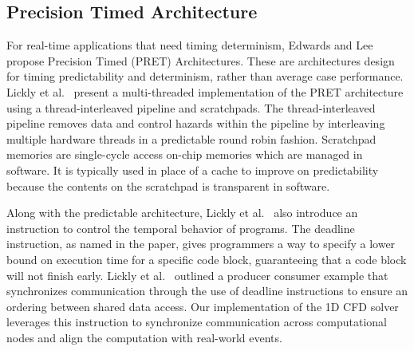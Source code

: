 \subsection{Precision Timed Architecture}
\label{sec:PRET}
For real-time applications that need timing determinism, Edwards and Lee~\cite{Edwards:2007} propose Precision Timed (PRET) Architectures. 
These are architectures design for timing predictability and determinism, rather than average case performance. 
Lickly et al.~\cite{pret_cases08} present a multi-threaded implementation of the PRET architecture using a thread-interleaved pipeline and scratchpads.  
The thread-interleaved pipeline removes data and control hazards within the pipeline by interleaving multiple hardware threads in a predictable round robin fashion.
Scratchpad memories are single-cycle access on-chip memories which are managed in software. 
It is typically used in place of a cache to improve on predictability because the contents on the scratchpad is transparent in software. 

Along with the predictable architecture, Lickly et al.~\cite{pret_cases08} also introduce an instruction to control the temporal behavior of programs.
The deadline instruction, as named in the paper, gives programmers a way to specify a lower bound on execution time for a specific code block, guaranteeing that a code block will not finish early.
Lickly et al.~\cite{pret_cases08} outlined a producer consumer example that synchronizes communication through the use of deadline instructions to ensure an ordering between shared data access. 
Our implementation of the 1D CFD solver leverages this instruction to synchronize communication across computational nodes and align the computation with real-world events. 

